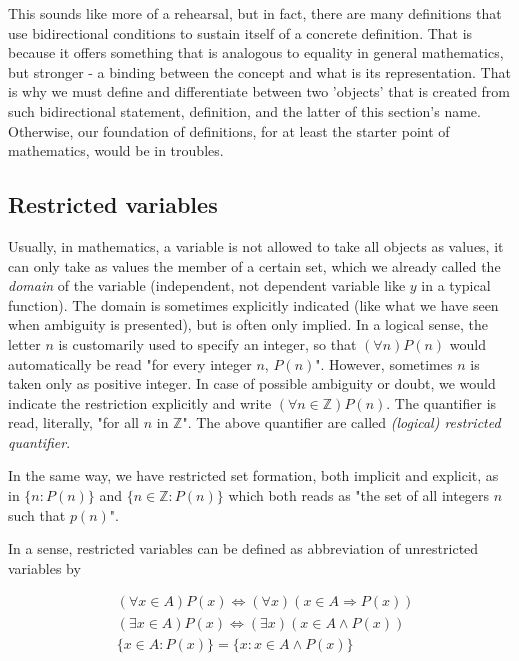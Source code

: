 This sounds like more of a rehearsal, but in fact, there are many definitions that use bidirectional conditions to sustain itself of a concrete definition. That is because it offers something that is analogous to equality in general mathematics, but stronger - a binding between the concept and what is its representation. That is why we must define and differentiate between two 'objects' that is created from such bidirectional statement, definition, and the latter of this section's name. Otherwise, our foundation of definitions, for at least the starter point of mathematics, would be in troubles. 

\subsection{Restricted variables}

Usually, in mathematics, a variable is not allowed to take all objects as values, it can only take as values the member of a certain set, which we already called the \textit{domain} of the variable (independent, not dependent variable like $y$ in a typical function). The domain is sometimes explicitly indicated (like what we have seen when ambiguity is presented), but is often only implied. In a logical sense, the letter $n$ is customarily used to specify an integer, so that $(\forall n)P(n)$ would automatically be read "for every integer $n$, $P(n)$". However, sometimes $n$ is taken only as positive integer. In case of possible ambiguity or doubt, we would indicate the restriction explicitly and write $(\forall n \in \mathbb{Z})P(n)$. The quantifier is read, literally, "for all $n$ in $\mathbb{Z}$". The above quantifier are called \textit{(logical) restricted quantifier}. 

In the same way, we have restricted set formation, both implicit and explicit, as in $\{n: P(n)\}$ and $\{n\in\mathbb{Z}: P(n)\}$ which both reads as "the set of all integers $n$ such that $p(n)$".

In a sense, restricted variables can be defined as abbreviation of unrestricted variables by 

\begin{align*}
    & (\forall x\in A)P(x) \Leftrightarrow (\forall x)(x\in A \Rightarrow P(x)) \\
    & (\exists x \in A)P(x) \Leftrightarrow (\exists x)( x\in A \land P(x))\\
    & \{x\in A: P(x)\} = \{x: x\in A \land P(x)\}
\end{align*}

